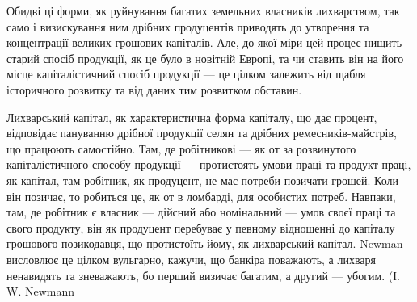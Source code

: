 Обидві ці форми, як руйнування багатих земельних власників лихварством,
так само і визискування ним дрібних продуцентів приводять до утворення та
концентрації великих грошових капіталів. Але, до якої міри цей процес нищить
старий спосіб продукції, як це було в новітній Европі, та чи ставить він на
його місце капіталістичний спосіб продукції — це цілком залежить від щабля
історичного розвитку та від даних тим розвитком обставин.

Лихварський капітал, як характеристична форма капіталу, що дає процент,
відповідає пануванню дрібної продукції селян та дрібних ремесників-майстрів,
що працюють самостійно. Там, де робітникові — як от за розвинутого капіталістичного
способу продукції — протистоять умови праці та продукт праці, як капітал,
там робітник, як продуцент, не має потреби позичати грошей. Коли він позичає, то
робиться це, як от в ломбарді, для особистих потреб. Навпаки, там, де робітник
є власник — дійсний або номінальний — умов своєї праці та свого продукту, він
як продуцент перебуває у певному відношенні до капіталу грошового позикодавця,
що протистоїть йому, як лихварський капітал. Newman висловлює це
цілком вульгарно, кажучи, що банкіра поважають, а лихваря ненавидять та зневажають,
бо перший визичає багатим, а другий — убогим. (І. W. Newmann
\parbreak{}  %

